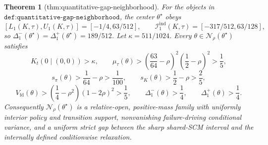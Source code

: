 \documentclass{article}
\newtheorem{theorem}{Theorem}
\begin{document}
\begin{theorem}[thm:quantitative-gap-neighborhood]\label{thm:quantitative-gap-neighborhood}
For the objects in \(\texttt{def:quantitative-gap-neighborhood}\), the center \(\theta^\star\) obeys
\[
 [L_1(K,\tau),U_1(K,\tau)]=[-1/4,63/512],
 \qquad
 \mathcal I_1^{\mathrm{ind}}(K,\tau)=[-317/512,63/128],
\]
so \(\Delta_1^-(\theta^\star)=\Delta_1^+(\theta^\star)=189/512\).  Let \(\kappa=511/1024\).  Every \(\theta\in\mathcal N_\rho(\theta^\star)\) satisfies
\[
 K_t(0\mid(0,0))>\kappa,
 \qquad
 \mu_\tau(\theta)>\left(\frac{63}{64}-\rho\right)^2
                         \left(\frac12-\rho\right)^2>\frac15,
\]
\[
 s_\pi(\theta)>\frac1{64}-\rho>\frac1{100},
 \qquad
 s_K(\theta)>\frac12-\rho>\frac25,
\]
\[
 V_{\mathrm{fd}}(\theta)>\left(\frac14-\rho^2\right)(1-2\rho)^2>\frac15,
 \qquad
 \Delta_1^-(\theta)>\frac14,
 \qquad
 \Delta_1^+(\theta)>\frac14.
\]
Consequently \(\mathcal N_\rho(\theta^\star)\) is a relative-open, positive-mass family with uniformly interior policy and transition support, nonvanishing failure-driving conditional variance, and a uniform strict gap between the sharp shared-SCM interval and the internally defined coalitionwise relaxation.
\end{theorem}
\end{document}
